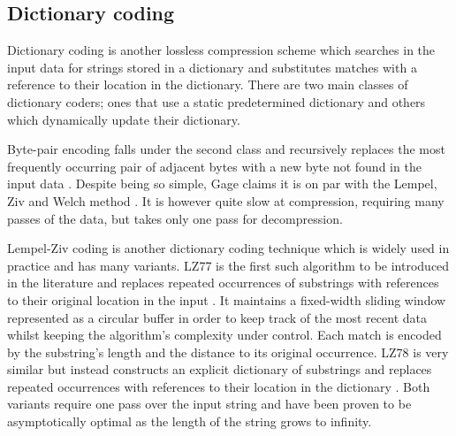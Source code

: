 \subsection{Dictionary coding}

Dictionary coding is another lossless compression scheme which searches in the input data for strings stored in a dictionary and substitutes matches with a reference to their location in the dictionary. There are two main classes of dictionary coders; ones that use a static predetermined dictionary and others which dynamically update their dictionary.

Byte-pair encoding falls under the second class and recursively replaces the most frequently occurring pair of adjacent bytes with a new byte not found in the input data \cite{byte-pair}. Despite being so simple, Gage claims it is on par with the Lempel, Ziv and Welch method \cite{lzw}. It is however quite slow at compression, requiring many passes of the data, but takes only one pass for decompression.

Lempel-Ziv coding is another dictionary coding technique which is widely used in practice and has many variants. LZ77 is the first such algorithm to be introduced in the literature and replaces repeated occurrences of substrings with references to their original location in the input \cite{lz77}. It maintains a fixed-width sliding window represented as a circular buffer in order to keep track of the most recent data whilst keeping the algorithm's complexity under control. Each match is encoded by the substring's length and the distance to its original occurrence. LZ78 is very similar but instead constructs an explicit dictionary of substrings and replaces repeated occurrences with references to their location in the dictionary \cite{lz78}. Both variants require one pass over the input string and have been proven to be asymptotically optimal as the length of the string grows to infinity.

